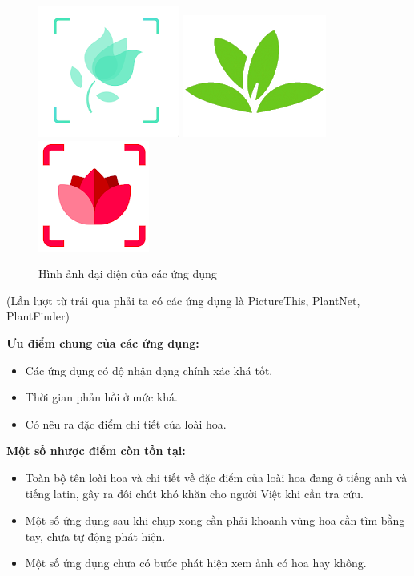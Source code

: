 \documentclass[12pt]{report}
\begin{document}
		\begin{figure}[h]
			\centering
			\includegraphics[scale=0.7]{picture_this_app}
			\includegraphics[scale=0.7]{plantnet_app}
			\includegraphics[scale=0.7]{plantfinder_app}
			\caption{Hình ảnh đại diện của các ứng dụng}
			\label{fig:app_logo_curent}
		\end{figure}
		(Lần lượt từ trái qua phải ta có các ứng dụng là PictureThis, PlantNet, PlantFinder)
		
		\textbf{Ưu điểm chung của các ứng dụng:}
		\begin{itemize}
			\item Các ứng dụng có độ nhận dạng chính xác khá tốt.
			\item Thời gian phản hồi ở mức khá.
			\item Có nêu ra đặc điểm chi tiết của loài hoa.
		\end{itemize}
		\textbf{Một số nhược điểm còn tồn tại:}
		\begin{itemize}
			\item Toàn bộ tên loài hoa và chi tiết về đặc điểm của loài hoa đang ở tiếng anh và tiếng latin, gây ra đôi chút khó khăn cho người Việt khi cần tra cứu.
			\item Một số ứng dụng sau khi chụp xong cần phải khoanh vùng hoa cần tìm bằng tay, chưa tự động phát hiện.
			\item Một số ứng dụng chưa có bước phát hiện xem ảnh có hoa hay không.
		\end{itemize}
																		
\end{document}

